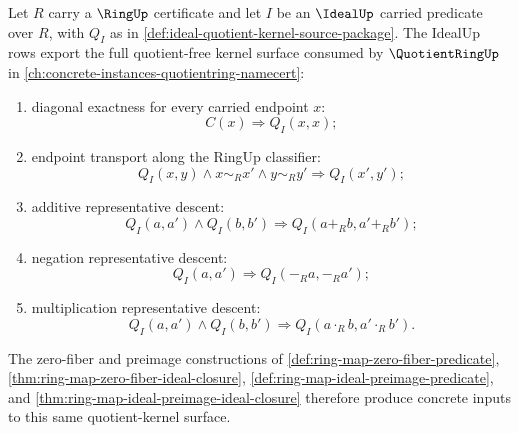 \begin{theorem}
\label{thm:ideal-quotientring-export-surface}
Let $R$ carry a $\RingUp$ certificate and let $I$ be an $\IdealUp$ carried predicate over $R$, with $Q_I$ as in \autoref{def:ideal-quotient-kernel-source-package}. The IdealUp rows export the full quotient-free kernel surface consumed by $\QuotientRingUp$ in \autoref{ch:concrete-instances-quotientring-namecert}:
\begin{enumerate}
\item diagonal exactness for every carried endpoint $x$:
$$
C(x)\Longrightarrow Q_I(x,x);
$$
\item endpoint transport along the RingUp classifier:
$$
Q_I(x,y)\land x\sim_R x'\land y\sim_R y'\Longrightarrow Q_I(x',y');
$$
\item additive representative descent:
$$
Q_I(a,a')\land Q_I(b,b')\Longrightarrow Q_I(a+_R b,a'+_R b');
$$
\item negation representative descent:
$$
Q_I(a,a')\Longrightarrow Q_I(-_R a,-_R a');
$$
\item multiplication representative descent:
$$
Q_I(a,a')\land Q_I(b,b')\Longrightarrow Q_I(a\cdot_R b,a'\cdot_R b').
$$
\end{enumerate}
The zero-fiber and preimage constructions of \autoref{def:ring-map-zero-fiber-predicate}, \autoref{thm:ring-map-zero-fiber-ideal-closure}, \autoref{def:ring-map-ideal-preimage-predicate}, and \autoref{thm:ring-map-ideal-preimage-ideal-closure} therefore produce concrete inputs to this same quotient-kernel surface.
\end{theorem}
